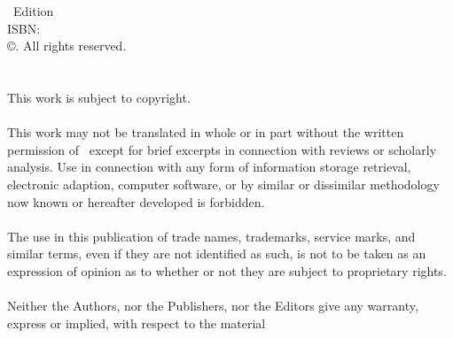 \documentclass[
  letterpaper,
  10pt,
  reqno,
  twopage,
  openany]{book}
\begin{document}
\begin{titlepage}
\pagestyle{empty}\text{ }\\[1in]\begin{center} \Huge \textbf{\sc \firstTitle} \end{center}
\newpage \text{ }\vspace{1in}\begin{center}\begin{minipage}{.85\textwidth}\dedication \vfill\vfill\vfill\text{ }\end{minipage}\end{center}
\clearpage \text{ }\\[30pt]
\noindent\Large \authname \\[50pt]
\noindent\Huge \textbf{\firstTitle} \\[20pt]
\noindent\Large\textbf{\secondTitle} 
\\[25pt]\noindent\large\edition \ Edition
\vfill
\newpage\footnotesize\noindent\cover \vfill \text{ } \\[7pt]
ISBN: \isbn \\[10pt]
\copyright \authname. 
All rights reserved. \\ \\ \\ 
This work is subject to copyright. \\ \\ 
This work may not be translated in whole or in part without the written permission of \publisher\ except for brief excerpts in 
connection with reviews or scholarly analysis.  Use in connection with any form of information storage retrieval, 
electronic adaption, computer software, or by similar or dissimilar methodology now known or hereafter developed is forbidden. \\ \\ 
The use in this publication of trade names, trademarks, service marks, and similar terms, even if they are not identified as 
such, is not to be taken as an expression of opinion as to whether or not they are subject to proprietary rights. \\ \\ 
Neither the Authors, nor the Publishers, nor the Editors give any warranty, express or implied, with respect to the material 

\end{titlepage}
\end{document}
